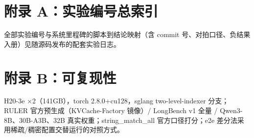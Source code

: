 \documentclass[11pt]{article}
\begin{document}
\section*{附录 A：实验编号总索引}
全部实验编号与系统里程碑的脚本到结论映射（含 commit 号、对拍口径、负结果入册）见随源码发布的配套实验日志。

\section*{附录 B：可复现性}
H20-3e $\times$2（141GB），torch 2.8.0+cu128，sglang two-level-indexer 分支；RULER 官方预生成（KVCache-Factory 镜像）/ LongBench v1 全量 / Qwen3-8B、30B-A3B、32B 真实权重；string\_match\_all 官方口径打分；e2e 差分法采用稀疏/稠密配置交替运行的对照方式。
\end{document}
